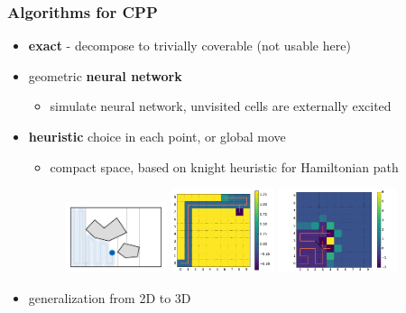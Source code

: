 \documentclass{beamer}
\begin{document}
\begin{frame}
  \frametitle{Algorithms for CPP}
  \begin{itemize}
    \item \textbf{exact} - decompose to trivially coverable (not usable here)
    \item geometric \textbf{neural network}
      \begin{itemize}
      \item simulate neural network, unvisited cells are externally excited
      \end{itemize}
    \item \textbf{heuristic} choice in each point, or global move
      \begin{itemize}
      \item compact space, based on knight heuristic for Hamiltonian path
      \end{itemize}

      \begin{figure}[ht]
        \centering
        \includegraphics[width=3cm]{decomp_boustrop.pdf}
        \quad
        \includegraphics[width=3cm]{expl_nn_fn.pdf}
        \includegraphics[width=3.5cm]{expl_heuristic_fn.pdf}
      \end{figure}
     \item generalization from 2D to 3D
    \end{itemize}
\end{frame}
\end{document}
